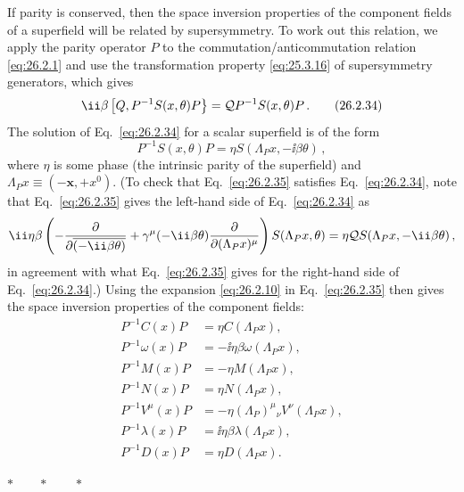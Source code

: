 If parity is conserved, then the space inversion properties of the component
fields of a superfield will be related by supersymmetry. To work out this
relation, we apply the parity operator $P$ to the commutation/anticommutation
relation \eqref{eq:26.2.1} and use the transformation property
\eqref{eq:25.3.16} of supersymmetry generators, which gives
\begin{equation}
  \ii\beta\gradedbracket{Q}{P^{-1}S(x,\theta)P}
  =\SuperQ P^{-1}S(x,\theta)P\,.
  \tag{26.2.34}\label{eq:26.2.34}
\end{equation}
The solution of Eq.~\eqref{eq:26.2.34} for a scalar superfield is of the form
\begin{equation}
  P^{-1}S(x,\theta)P
  =\eta S(\Lambda_Px,-\ii\beta\theta)\,,
  \tag{26.2.35}\label{eq:26.2.35}
\end{equation}
where $\eta$ is some phase (the intrinsic parity of the superfield) and
$\Lambda_Px\equiv(-\mathbf{x},+x^0)$. (To check that
Eq.~\eqref{eq:26.2.35} satisfies Eq.~\eqref{eq:26.2.34}, note that
Eq.~\eqref{eq:26.2.35} gives the left-hand side of Eq.~\eqref{eq:26.2.34} as
\[
  \ii\eta\beta\left(
    -\frac{\partial}{\partial\overline{(-\ii\beta\theta)}}
    +\gamma^\mu(-\ii\beta\theta)
      \frac{\partial}{\partial(\Lambda_Px)^\mu}
    \right)S(\Lambda_Px,\theta)
  =\eta\SuperQ S(\Lambda_Px,-\ii\beta\theta)\,,
\]
in agreement with what Eq.~\eqref{eq:26.2.35} gives for the right-hand side of
Eq.~\eqref{eq:26.2.34}.) Using the expansion \eqref{eq:26.2.10} in
Eq.~\eqref{eq:26.2.35} then gives the space inversion properties of the
component fields:
\begin{equation}
  \begin{aligned}
  P^{-1}C(x)P&=\eta C(\Lambda_Px),\\
  P^{-1}\omega(x)P&=-\ii\eta\beta\omega(\Lambda_Px),\\
  P^{-1}M(x)P&=-\eta M(\Lambda_Px),\\
  P^{-1}N(x)P&=\eta N(\Lambda_Px),\\
  P^{-1}V^\mu(x)P&=-\eta(\Lambda_P)^\mu{}_\nu V^\nu(\Lambda_Px),\\
  P^{-1}\lambda(x)P&=\ii\eta\beta\lambda(\Lambda_Px),\\
  P^{-1}D(x)P&=\eta D(\Lambda_Px).
  \end{aligned}
  \tag{26.2.36}\label{eq:26.2.36}
\end{equation}

\begin{center}
\(\ast\qquad\ast\qquad\ast\)
\end{center}

